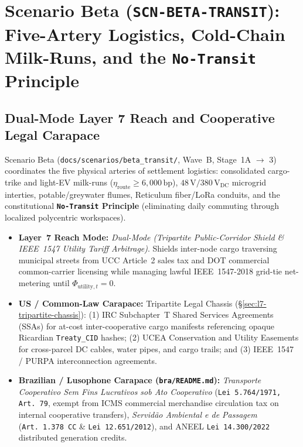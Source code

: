 \chapter{Scenario Beta (\texttt{SCN-BETA-TRANSIT}): Five-Artery Logistics, Cold-Chain Milk-Runs, and the \texttt{No-Transit} Principle}
\label{app:scenario-beta}

\section{Dual-Mode Layer 7 Reach and Cooperative Legal Carapace}
Scenario Beta (\texttt{docs/scenarios/beta\_transit/}, Wave~B, Stage~1A $\to$ 3) coordinates the five physical arteries of settlement logistics: consolidated cargo-trike and light-EV milk-runs ($\eta_{\mathrm{route}} \ge 6{,}000\,\mathrm{bp}$), $48\,\mathrm{V}/380\,\mathrm{V}_{\mathrm{DC}}$ microgrid interties, potable/greywater flumes, Reticulum fiber/LoRa conduits, and the constitutional \textbf{\texttt{No-Transit} Principle} (eliminating daily commuting through localized polycentric workspaces).
\begin{itemize}
    \item \textbf{Layer~7 Reach Mode:} \textit{Dual-Mode (Tripartite Public-Corridor Shield \& IEEE~1547 Utility Tariff Arbitrage)}. Shields inter-node cargo traversing municipal streets from UCC Article~2 sales tax and DOT commercial common-carrier licensing while managing lawful IEEE~1547-2018 grid-tie net-metering until $\Phi_{\mathrm{utility},t} = 0$.
    \item \textbf{US / Common-Law Carapace:} Tripartite Legal Chassis (\S\ref{sec:l7-tripartite-chassis}): (1) IRC Subchapter~T Shared Services Agreements (SSAs) for at-cost inter-cooperative cargo manifests referencing opaque Ricardian \texttt{Treaty\_CID} hashes; (2) UCEA Conservation and Utility Easements for cross-parcel DC cables, water pipes, and cargo trails; and (3) IEEE~1547 / PURPA interconnection agreements.
    \item \textbf{Brazilian / Lusophone Carapace (\texttt{bra/README.md}):} \textit{Transporte Cooperativo Sem Fins Lucrativos sob Ato Cooperativo} (\texttt{Lei 5.764/1971, Art.~79}, exempt from ICMS commercial merchandise circulation tax on internal cooperative transfers), \textit{Servid{\~a}o Ambiental e de Passagem} (\texttt{Art.~1.378 CC} \& \texttt{Lei 12.651/2012}), and ANEEL \texttt{Lei 14.300/2022} distributed generation credits.
\end{itemize}


